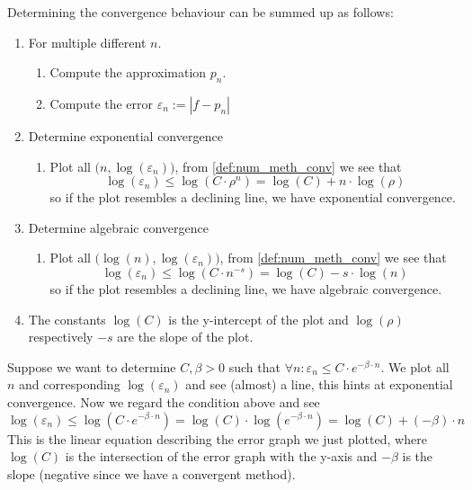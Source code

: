 Determining the convergence behaviour can be summed up as follows:
\begin{enumerate}
   \item For multiple different \(n\).
      \begin{enumerate}
         \item Compute the approximation \(p_n\).
         \item Compute the error \(\varepsilon_n := |f - p_n|\)
      \end{enumerate}
   \item Determine exponential convergence
      \begin{enumerate}
         \item Plot all \(\big(n, \log(\varepsilon_n)\big)\), from \cref{def:num_meth_conv} we see that
            \[\log(\varepsilon_n) \leq \log(C \cdot \rho^n) = \log(C) + n \cdot \log(\rho)\]
            so if the plot resembles a declining line, we have exponential convergence.
      \end{enumerate}
   \item Determine algebraic convergence
      \begin{enumerate}
         \item Plot all \(\big(\log(n), \log(\varepsilon_n)\big)\), from \cref{def:num_meth_conv} we see that
            \[\log(\varepsilon_n) \leq \log(C \cdot n^{-s}) = \log(C) - s \cdot \log(n)\]
            so if the plot resembles a declining line, we have algebraic convergence.
      \end{enumerate}
   \item The constants \(\log(C)\) is the y-intercept of the plot and \(\log(\rho)\) respectively \(-s\) are the slope of the plot.
\end{enumerate}

\begin{example}
   Suppose we want to determine \(C, \beta > 0\) such that \(\forall n: \varepsilon_n \leq C \cdot e^{-\beta \cdot n}\).
   We plot all \(n\) and corresponding \(\log(\varepsilon_n)\) and see (almost) a line, this hints at exponential convergence.
   Now we regard the condition above and see
   \[\log(\varepsilon_n) \leq \log(C \cdot e^{-\beta \cdot n}) = \log(C) \cdot \log(e^{-\beta \cdot n}) = \log(C) + (-\beta) \cdot n\]
   This is the linear equation describing the error graph we just plotted, where \(\log(C)\) is the intersection of the error graph with the y-axis and \(-\beta\) is the slope (negative since we have a convergent method).
\end{example}

